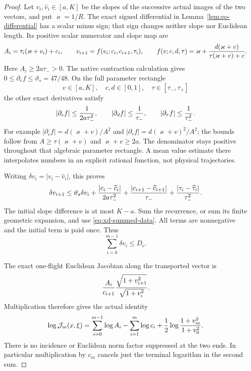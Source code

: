 \begin{proof}
Let $v_i,\widehat v_i\in[a,K]$ be the slopes of the successive
actual images of the two vectors, and put $\varkappa=1/R$.
The exact signed differential in Lemma~\ref{lem:eo-differential}
has a scalar minus sign; that sign changes neither slope nor
Euclidean length.  Its positive scalar numerator and slope map are
\begin{equation}\label{eq:xd-A-and-f}
 A_i=\tau_i(\varkappa+v_i)+c_i,\qquad
 v_{i+1}=f(v_i;c_i,c_{i+1},\tau_i),\qquad
 f(v;c,d,\tau)=\varkappa+
                     {d(\varkappa+v)\over\tau(\varkappa+v)+c}.
\end{equation}
Here $A_i\ge2a\tau_->0$.  The native contraction calculation gives
$0\le\partial_v f\le\vartheta_s=47/48$.
On the full parameter rectangle
\[
 v\in[a,K],\quad c,d\in[0,1],\quad\tau\in[\tau_-,\tau_+]
\]
the other exact derivatives satisfy
\begin{equation}\label{eq:xd-parameter-derivatives}
 |\partial_c f|\le{1\over2a\tau_-^2},\qquad
 |\partial_d f|\le{1\over\tau_-},\qquad
 |\partial_\tau f|\le{1\over\tau_-^2}.
\end{equation}
For example $|\partial_c f|=d(\varkappa+v)/A^2$ and
$|\partial_\tau f|=d(\varkappa+v)^2/A^2$; the bounds follow from
$A\ge\tau(\varkappa+v)$ and $\varkappa+v\ge2a$.
The denominator stays positive throughout that algebraic parameter
rectangle.  A mean value estimate there interpolates numbers in
an explicit rational function, not physical trajectories.

Writing $\delta v_i=|v_i-\widehat v_i|$, this proves
\[
 \delta v_{i+1}\le\vartheta_s\delta v_i
   +{ |c_i-\widehat c_i|\over2a\tau_-^2}
   +{ |c_{i+1}-\widehat c_{i+1}|\over\tau_-}
   +{ |\tau_i-\widehat\tau_i|\over\tau_-^2}.
\]
The initial slope difference is at most $K-a$.  Sum the recurrence,
or sum its finite geometric expansion, and use
\eqref{eq:xd-summed-data}.  All terms are nonnegative and the initial
term is paid once.  Thus
\begin{equation}\label{eq:xd-slope-sum}
                    \sum_{i=0}^{m-1}\delta v_i\le D_v.
\end{equation}

The exact one-flight Euclidean Jacobian along the transported vector
is
\[
 {A_i\over c_{i+1}}
       {\sqrt{1+v_{i+1}^2}\over\sqrt{1+v_i^2}}.
\]
Multiplication therefore gives the actual identity
\begin{equation}\label{eq:xd-log-jacobian}
 \log\mathcal J_m(x,\xi)
 =\sum_{i=0}^{m-1}\log A_i-\sum_{i=1}^{m}\log c_i
          +{1\over2}\log{1+v_m^2\over1+v_0^2}.
\end{equation}
There is no incidence or Euclidean norm factor suppressed at the
two ends.  In particular multiplication by $c_m$ cancels just the
terminal logarithm in the second sum.


\end{proof}
